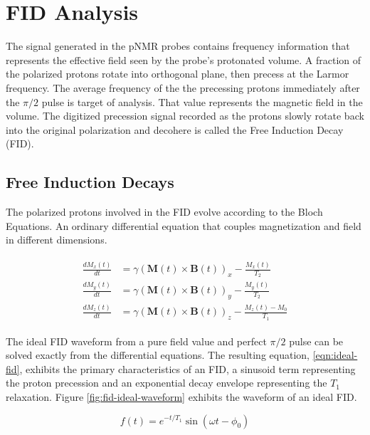 \chapter{FID Analysis}

The signal generated in the pNMR probes contains frequency information that represents the effective field seen by the probe's protonated volume.  A fraction of the polarized protons rotate into orthogonal plane, then precess at the Larmor frequency.  The average frequency of the the precessing protons immediately after the $\pi/2$ pulse is target of analysis.  That value represents the magnetic field in the volume.  The digitized precession signal recorded as the protons slowly rotate back into the original polarization and decohere is called the Free Induction Decay (FID).

\section{Free Induction Decays}

The polarized protons involved in the FID evolve according to the Bloch Equations.  An ordinary differential equation that couples magnetization and field in different dimensions.

\begin{align} 
\begin{split}
\label{eqn:fid-bloch}
\frac{dM_x(t)}{dt} & = \gamma (\mathbf{M}(t) \times \mathbf{B}(t))_x - \frac{M_x(t)}{T_2} \\
\frac{dM_y(t)}{dt} & = \gamma (\mathbf{M}(t)\times \mathbf{B}(t))_y - \frac{M_y(t)}{T_2} \\
\frac{dM_z(t)}{dt} & = \gamma (\mathbf{M}(t) \times \mathbf{B}(t))_z - \frac{M_z(t) - M_0}{T_1}
\end{split} 
\end{align}

The ideal FID waveform from a pure field value and perfect $\pi/2$ pulse can be solved exactly from the differential equations.  The resulting equation, \ref{eqn:ideal-fid}, exhibits the primary characteristics of an FID, a sinusoid term representing the proton precession and an exponential decay envelope representing the $T_1$ relaxation.  Figure \ref{fig:fid-ideal-waveform} exhibits the waveform of an ideal FID.

\begin{equation}
f(t) = e^{-t/T_1} \sin(\omega t - \phi_0)
\label{eqn:ideal-fid}
\end{equation}

